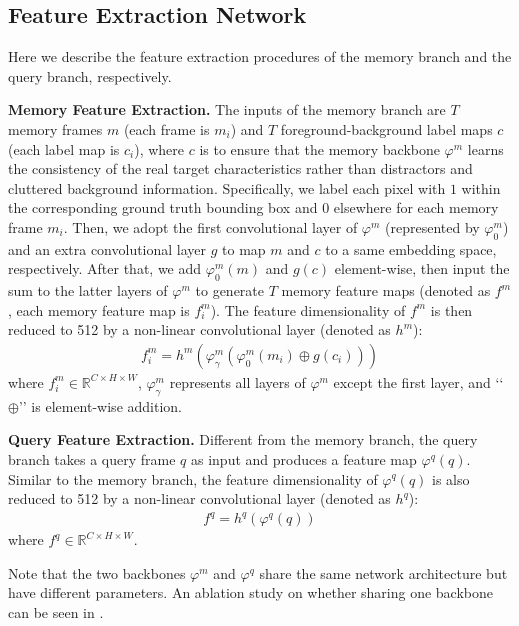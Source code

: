 \documentclass[final]{cvpr}
\begin{document}
\subsection{Feature Extraction Network}\label{subsec:feature-extraction-network}
Here we describe the feature extraction procedures of the memory branch and the query branch, respectively.
\par
\textbf{Memory Feature Extraction.}
The inputs of the memory branch are $T$ memory frames $m$ (each frame is $m_i$) and $T$ foreground-background label maps $c$ (each label map is $c_i$), where $c$ is to ensure that the memory backbone $\varphi^{m}$ learns the consistency of the real target characteristics rather than distractors and cluttered background information.
Specifically, we label each pixel with $1$ within the corresponding ground truth bounding box and $0$ elsewhere for each memory frame $m_i$.
Then, we adopt the first convolutional layer of $\varphi^{m}$ (represented by $\varphi^{m}_{0}$) and an extra convolutional layer $g$ to map $m$ and $c$ to a same embedding space, respectively.
After that, we add $\varphi^{m}_{0}(m)$ and $g(c)$ element-wise, then input the sum to the latter layers of $\varphi^{m}$ to generate $T$ memory feature maps (denoted as $f^{m}$, each memory feature map is $f^{m}_{i}$).
The feature dimensionality of $f^{m}$ is then reduced to 512 by a non-linear convolutional layer (denoted as $h^{m}$):
\begin{equation}\label{eq:backbone_m}
\begin{split}
f^{m}_{i}=h^{m}(\varphi^{m}_{\gamma}(\varphi^{m}_{0}(m_{i}) \oplus g(c_{i})))
\end{split}
\end{equation}
where $f^{m}_{i} \in \mathbb{R}^{C \times H \times W}$, $\varphi^{m}_{\gamma}$ represents all layers of $\varphi^{m}$ except the first layer, and \lq\lq{$\oplus$}\rq\rq{} is element-wise addition.
\par
\textbf{Query Feature Extraction.}
Different from the memory branch, the query branch takes a query frame $q$ as input and produces a feature map $\varphi^{q}(q)$.
Similar to the memory branch, the feature dimensionality of $\varphi^{q}(q)$ is also reduced to 512 by a non-linear convolutional layer (denoted as $h^{q}$):
\begin{equation}\label{eq:backbone_q}
\begin{split}
f^{q}=h^{q}(\varphi^{q}(q))
\end{split}
\end{equation}
where $f^{q} \in \mathbb{R}^{C \times H \times W}$.
\par
Note that the two backbones $\varphi^{m}$ and $\varphi^{q}$ share the same network architecture but have different parameters.
An ablation study on whether sharing one backbone can be seen in .
\par
\end{document}
